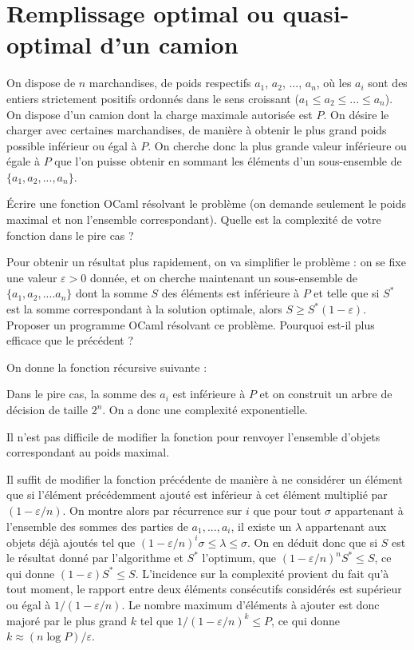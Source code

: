 \renewcommand{\SourceFile}{3-strategies-gloutonnes/src/3-3.ml}

\section{Remplissage optimal ou quasi-optimal d'un camion}

On dispose de $n$ marchandises, de poids respectifs $a_1$, $a_2$, ..., $a_n$, où les $a_i$ sont des entiers strictement positifs ordonnés dans le sens croissant ($a_1 \leq a_2 \leq ... \leq a_n$). On dispose d'un camion dont la charge maximale autorisée est $P$. On désire le charger avec certaines marchandises, de manière à obtenir le plus grand poids possible inférieur ou égal à $P$. On cherche donc la plus grande valeur inférieure ou égale à $P$ que l'on puisse obtenir en sommant les éléments d'un sous-ensemble de $\{a_1,a_2,...,a_n\}$.

\Q
Écrire une fonction OCaml résolvant le problème (on demande seulement le poids maximal et non l'ensemble correspondant). Quelle est la complexité de votre fonction dans le pire cas ?

\Q
Pour obtenir un résultat plus rapidement, on va simplifier le problème : on se fixe une valeur $\varepsilon>0$ donnée, et on cherche maintenant un sous-ensemble de $\{a_1,a_2,....a_n\}$ dont la somme $S$ des éléments est inférieure à $P$ et telle que si $S^*$ est la somme correspondant à la solution optimale, alors $S\geq S^*(1-\varepsilon)$. Proposer un programme OCaml résolvant ce problème. Pourquoi est-il plus efficace que le précédent ?

\Corrige

\Q
On donne la fonction récursive suivante :



Dans le pire cas, la somme des $a_i$ est inférieure à $P$ et on construit un arbre de décision de taille $2^n$. On a donc une complexité exponentielle.
\smallskip

Il n'est pas difficile de modifier la fonction pour renvoyer l'ensemble d'objets correspondant au poids maximal.

\Q
Il suffit de modifier la fonction précédente de manière à ne considérer un élément que si l'élément précédemment ajouté est inférieur à cet élément multiplié par $(1-\varepsilon/n)$. On montre alors par récurrence sur $i$ que pour tout $\sigma$ appartenant à l'ensemble des sommes des parties de $a_1,...,a_i$, il existe un $\lambda$ appartenant aux objets déjà ajoutés tel que $(1-\varepsilon/n)^i\sigma \leq \lambda \leq \sigma$. On en déduit donc que si $S$ est le résultat donné par l'algorithme et $S^*$ l'optimum, que $(1-\varepsilon/n)^nS^* \leq S$, ce qui donne $(1-\varepsilon)S^* \leq S$. L'incidence sur la complexité provient du fait qu'à tout moment, le rapport entre deux éléments consécutifs considérés est supérieur ou égal à $1/(1-\varepsilon/n)$. Le nombre maximum d'éléments à ajouter est donc majoré par le plus grand $k$ tel que $1/(1-\varepsilon/n)^k \leq P$, ce qui donne $k \approx (n\log P)/\varepsilon$.
\bigskip

\Fin
